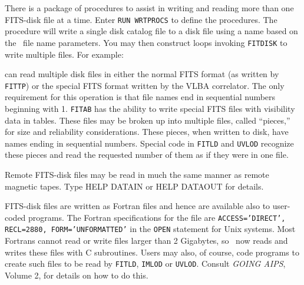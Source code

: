      There is a package of procedures to assist in writing and reading
more than one FITS-disk file at a time.  Enter {\tt RUN WRTPROCS} to
define the procedures.  The procedure {\tt {}} will write
a single disk catalog file to a disk file using a name based on the
\AIPS\ file name parameters.  You may then construct loops invoking
{\tt FITDISK} to write multiple files.  For example:
\btd
{}
\etd
{}

     {\tt {}} can read multiple disk files in either the
normal FITS format (as written by {\tt FITTP}) or the special FITS
format written by the VLBA correlator.  The only requirement for this
operation is that file names end in sequential numbers beginning with
1.  {\tt FITAB} has the ability to write special FITS files with
visibility data in tables.  These files may be broken up into multiple
files, called ``pieces,'' for size and reliability considerations.
These pieces, when written to disk, have names ending in sequential
numbers.  Special code in {\tt FITLD} and {\tt UVLOD} recognize these
pieces and read the requested number of them as if they were in one
file.

     Remote FITS-disk files may be read in much the same manner as
remote magnetic tapes.  Type {\us HELP DATAIN \CR} or {\us HELP
DATAOUT \CR} for details.

     FITS-disk files are written as Fortran files and hence are
available also to user-coded programs.  The Fortran specifications for
the file are {\tt ACCESS='DIRECT', RECL=2880, FORM='UNFORMATTED'} in
the {\tt OPEN} statement for Unix systems.  Most Fortrans cannot read
or write files larger than 2 Gigabytes, so \AIPS\ now reads and writes
these files with C subroutines.  Users may also, of course, code
programs to create such files to be read by {\tt FITLD}, {\tt IMLOD}
or \hbox{{\tt UVLOD}}.  Consult {\it GOING AIPS\/}, Volume 2,
 for details on how to do this.

